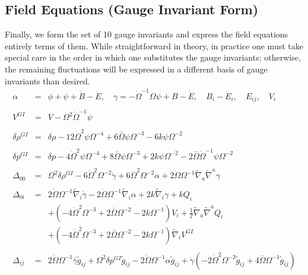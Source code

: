 \subsection{Field Equations (Gauge Invariant Form)}
Finally, we form the set of 10 gauge invariants and express the field equations entirely terms of them. While straightforward in theory, in practice one must take special care in the order in which one substitutes the gauge invariants; otherwise, the remaining fluctuations will be expressed in a different basis of gauge invariants than desired.
\begin{eqnarray}
\alpha  &=& \phi + \psi + \dot B - \ddot E,\quad \gamma = - \dot\Omega^{-1}\Omega \psi + B - \dot E,
\quad B_i - \dot E_i,\quad E_{ij},\quad V_i
\nonumber\\ \\
V^{GI} &=& V-\Omega^2 \dot \Omega^{-1}\psi
\\ \nonumber\\
\delta \rho^{GI}&=&\delta \rho - 12 \dot{\Omega}^2 \psi \Omega^{-4} + 6 \overset{..}{\Omega} \psi \Omega^{-3} - 6 k \psi \Omega^{-2}
\\ \nonumber\\ 
\delta p^{GI}&=&\delta p - 4 \dot{\Omega}^2 \psi \Omega^{-4} + 8 \overset{..}{\Omega} \psi \Omega^{-3} + 2 k \psi \Omega^{-2} - 2 \overset{...}{\Omega} \dot{\Omega}^{-1} \psi \Omega^{-2}
\\ \nonumber\\
\Delta_{00}&=& \Omega^2 \delta \rho^{GI}{} - 6 \dot{\Omega}^2 \Omega^{-2} \dot{\gamma} + 6 \dot{\Omega}^2 \Omega^{-2} \alpha + 2 \dot{\Omega} \Omega^{-1} \tilde{\nabla}_{a}\tilde{\nabla}^{a}\gamma 
\\  \nonumber\\ 
\Delta_{0i}&=& 2 \dot{\Omega} \Omega^{-1} \tilde{\nabla}_{i}\dot{\gamma} - 2 \dot{\Omega} \Omega^{-1} \tilde{\nabla}_{i}\alpha + 2 k \tilde{\nabla}_{i}\gamma +k Q_{i} 
\nonumber\\
&&+ (-4 \dot{\Omega}^2 \Omega^{-3} + 2 \overset{..}{\Omega} \Omega^{-2} - 2 k \Omega^{-1}) V_{i} + \tfrac{1}{2} \tilde{\nabla}_{a}\tilde{\nabla}^{a}Q_{i} \nonumber \\ 
&& + (-4 \dot{\Omega}^2 \Omega^{-3} + 2 \overset{..}{\Omega} \Omega^{-2} - 2 k \Omega^{-1}) \tilde{\nabla}_{i}V^{GI}{}
\\  \nonumber\\ 
\Delta_{ij}&=& 2 \dot{\Omega} \Omega^{-1} \overset{..}{\gamma} \tilde{g}_{ij} + \Omega^2 \delta p^{GI}{} \tilde{g}_{ij} - 2 \dot{\Omega} \Omega^{-1} \dot{\alpha} \tilde{g}_{ij} + \dot{\gamma} (-2 \dot{\Omega}^2 \Omega^{-2} \tilde{g}_{ij} + 4 \overset{..}{\Omega} \Omega^{-1} \tilde{g}_{ij}) \nonumber \\ 

\end{eqnarray}
